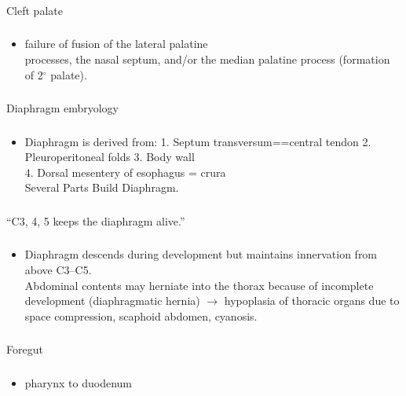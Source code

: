 \documentclass[11pt]{beamer}
\begin{document}
\begin{frame}
 \frametitle{}
Cleft palate
\end{frame}

\begin{frame}
 \frametitle{}
\begin{itemize}
\item{failure of fusion of the lateral palatine \\ processes, the nasal septum, and/or the median palatine process (formation of 2$^{\circ}$ palate).}
\end{itemize}
\end{frame}

\begin{frame}
 \frametitle{}
Diaphragm embryology
\end{frame}

\begin{frame}
 \frametitle{}
\begin{itemize}
\item{Diaphragm is derived from: 1. Septum transversum==central tendon  2. Pleuroperitoneal folds 3. Body wall \\ 4. Dorsal mesentery of esophagus = crura \\ Several Parts Build Diaphragm.}
\end{itemize}
\end{frame}

\begin{frame}
 \frametitle{}
“C3, 4, 5 keeps the diaphragm alive.”
\end{frame}

\begin{frame}
 \frametitle{}
\begin{itemize}
\item{Diaphragm descends during
development but maintains innervation from above C3–C5. \\ Abdominal contents may herniate into the thorax because of incomplete development (diaphragmatic hernia) ${\rightarrow}$ hypoplasia of thoracic organs due to space compression, scaphoid abdomen, cyanosis. }
\end{itemize}
\end{frame}

\begin{frame}
 \frametitle{}
Foregut
\end{frame}

\begin{frame}
 \frametitle{}
\begin{itemize}
\item{pharynx to duodenum}
\end{itemize}
\end{frame}
\end{document}
